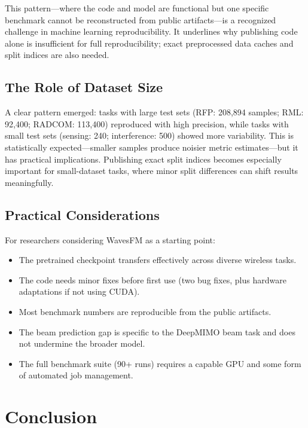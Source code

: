 \documentclass[11pt]{article}
\begin{document}
This pattern---where the code and model are functional but one specific benchmark cannot be reconstructed from public artifacts---is a recognized challenge in machine learning reproducibility. It underlines why publishing code alone is insufficient for full reproducibility; exact preprocessed data caches and split indices are also needed.

\subsection{The Role of Dataset Size}

A clear pattern emerged: tasks with large test sets (RFP: 208,894 samples; RML: 92,400; RADCOM: 113,400) reproduced with high precision, while tasks with small test sets (sensing: 240; interference: 500) showed more variability. This is statistically expected---smaller samples produce noisier metric estimates---but it has practical implications. Publishing exact split indices becomes especially important for small-dataset tasks, where minor split differences can shift results meaningfully.

\subsection{Practical Considerations}

For researchers considering WavesFM as a starting point:
\begin{itemize}
    \item The pretrained checkpoint transfers effectively across diverse wireless tasks.
    \item The code needs minor fixes before first use (two bug fixes, plus hardware adaptations if not using CUDA).
    \item Most benchmark numbers are reproducible from the public artifacts.
    \item The beam prediction gap is specific to the DeepMIMO beam task and does not undermine the broader model.
    \item The full benchmark suite (90+ runs) requires a capable GPU and some form of automated job management.
\end{itemize}

\section{Conclusion}
\label{sec:conclusion}
\end{document}
